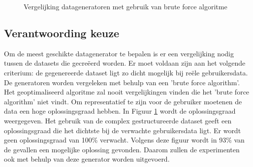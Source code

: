 \documentclass[Main.tex]{subfiles}
\begin{document}
\begin{figure}
\centering
{}
\caption{Vergelijking datageneratoren met gebruik van brute force algoritme} \label{fig:datageneratoren}
\end{figure}

\subsection{Verantwoording keuze}
Om de meest geschikte datagenerator te bepalen is er een vergelijking nodig tussen de datasets die gecre\"eerd worden. Er moet voldaan zijn aan het volgende criterium: de gegenereerde dataset ligt zo dicht mogelijk bij re\"ele gebruikersdata. De generatoren worden vergeleken met behulp van een 'brute force algorithm'. Het geoptimaliseerd algoritme zal nooit vergelijkingen vinden die het 'brute force algorithm' niet vindt. Om representatief te zijn voor de gebruiker moetenen de data een hoge oplossingsgraad hebben. In Figuur \ref{fig:datageneratoren} wordt de oplossingsgraad weergegeven. Het gebruik van de complex gestructureerde dataset geeft een oplossingsgraad die het dichtste bij de verwachte gebruikersdata ligt. Er wordt geen oplossingsgraad van 100\% verwacht. Volgens deze figuur wordt in 93\% van de gevallen een mogelijke oplossing gevonden. Daarom zullen de experimenten ook met behulp van deze generator worden uitgevoerd.
\end{document}
